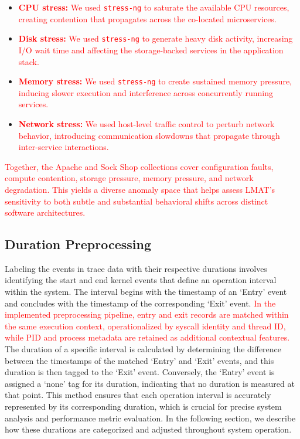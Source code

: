 \documentclass[preprint,12pt]{elsarticle}
\begin{document}
\begin{itemize}
    \item \textcolor{red}{\textbf{CPU stress:} We used \texttt{stress-ng} to saturate the available CPU resources, creating contention that propagates across the co-located microservices.}
    \item \textcolor{red}{\textbf{Disk stress:} We used \texttt{stress-ng} to generate heavy disk activity, increasing I/O wait time and affecting the storage-backed services in the application stack.}
    \item \textcolor{red}{\textbf{Memory stress:} We used \texttt{stress-ng} to create sustained memory pressure, inducing slower execution and interference across concurrently running services.}
    \item \textcolor{red}{\textbf{Network stress:} We used host-level traffic control to perturb network behavior, introducing communication slowdowns that propagate through inter-service interactions.}
\end{itemize}

\textcolor{red}{Together, the Apache and Sock Shop collections cover configuration faults, compute contention, storage pressure, memory pressure, and network degradation. This yields a diverse anomaly space that helps assess LMAT's sensitivity to both subtle and substantial behavioral shifts across distinct software architectures.}

\subsection{Duration Preprocessing}
Labeling the events in trace data with their respective durations involves identifying the start and end kernel events that define an operation interval within the system. The interval begins with the timestamp of an `Entry' event and concludes with the timestamp of the corresponding `Exit' event. \textcolor{red}{In the implemented preprocessing pipeline, entry and exit records are matched within the same execution context, operationalized by syscall identity and thread ID, while PID and process metadata are retained as additional contextual features.} The duration of a specific interval is calculated by determining the difference between the timestamps of the matched `Entry' and `Exit' events, and this duration is then tagged to the `Exit' event. Conversely, the `Entry' event is assigned a `none' tag for its duration, indicating that no duration is measured at that point. This method ensures that each operation interval is accurately represented by its corresponding duration, which is crucial for precise system analysis and performance metric evaluation. In the following section, we describe how these durations are categorized and adjusted throughout system operation.
\end{document}
